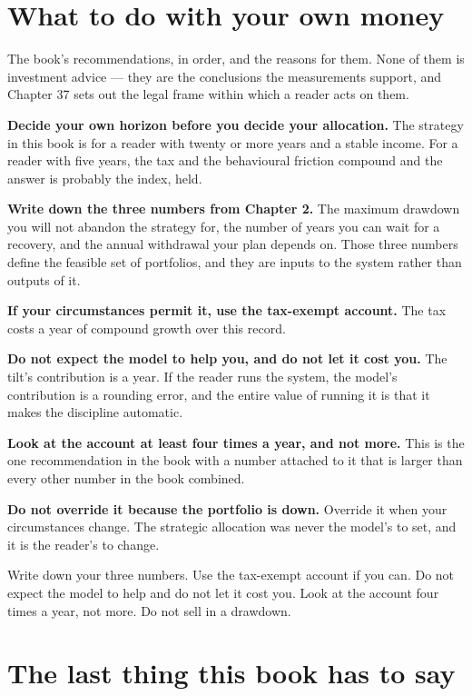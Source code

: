 \section{What to do with your own money}

The book's recommendations, in order, and the reasons for them. None of
them is investment advice --- they are the conclusions the measurements
support, and Chapter 37 sets out the legal frame within which a reader acts
on them.

\textbf{Decide your own horizon before you decide your allocation.} The
strategy in this book is for a reader with twenty or more years and a
stable income. For a reader with five years, the tax and the behavioural
friction compound and the answer is probably the index, held.

\textbf{Write down the three numbers from Chapter 2.} The maximum
drawdown you will not abandon the strategy for, the number of years you
can wait for a recovery, and the annual withdrawal your plan depends on.
Those three numbers define the feasible set of portfolios, and they are
inputs to the system rather than outputs of it.

\textbf{If your circumstances permit it, use the tax-exempt account.} The
tax costs \numTaxPenalty{} a year of compound growth over this record.

\textbf{Do not expect the model to help you, and do not let it cost you.}
The tilt's contribution is \numTiltMean{} a year. If the reader runs the
system, the model's contribution is a rounding error, and the entire
value of running it is that it makes the discipline automatic.

\textbf{Look at the account at least four times a year, and not more.} This
is the one recommendation in the book with a number attached to it that is
larger than every other number in the book combined.

\textbf{Do not override it because the portfolio is down.} Override it when
your circumstances change. The strategic allocation was never the
model's to set, and it is the reader's to change.

\begin{takeaway}
Write down your three numbers. Use the tax-exempt account if you can.
Do not expect the model to help and do not let it cost you. Look at the
account four times a year, not more. Do not sell in a drawdown.
\end{takeaway}

\section{The last thing this book has to say}

